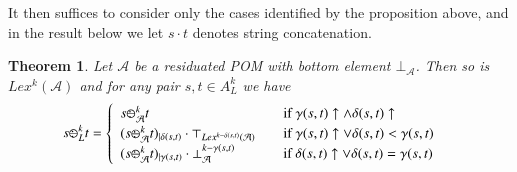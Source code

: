 \documentclass[a4paper]{elsarticle}
\newtheorem{theorem}{Theorem}
\newcommand{\1}{\mathbf{1}}
\def\odiv{{ \ominus\hspace{-8pt}:}\;}
\begin{document}
It then suffices to consider only the cases identified by the proposition above, and
in the result below we let $s \cdot t$ denotes string concatenation.

\begin{theorem}\label{prop:lexiRes}
	Let $\mathcal{A}$ be a residuated POM with bottom
	element $\bot_\mathcal{A}$.
	Then so is $Lex^k(\mathcal{A})$ and for any pair
	$s , t \in A^k_L$ we have
	\[
	s \odiv^k_L t = 	\begin{cases}
	\begin{array}{lcl}
	s \odiv^k_\mathcal{A} t & & \mbox{if  } \gamma(s,t) \uparrow \wedge \delta(s,t) \uparrow \\
	(s \odiv^k_\mathcal{A} t)_{\mid \delta(s,t)} \cdot \top_{Lex^{k-\delta(s,t)}(\mathcal{A})} & &  \mbox{if  } \gamma(s,t) \uparrow \vee \delta(s,t) < \gamma(s,t) \\
	(s \odiv^k_\mathcal{A} t)_{\mid \gamma(s,t)} \cdot \bot^{k - \gamma(s, t)}_\mathcal{A} & & \mbox{if  } \delta(s,t)  \uparrow \vee \delta(s,t) = \gamma(s,t)
	\end{array}
	\end{cases}
	\]
\end{theorem}
\end{document}
